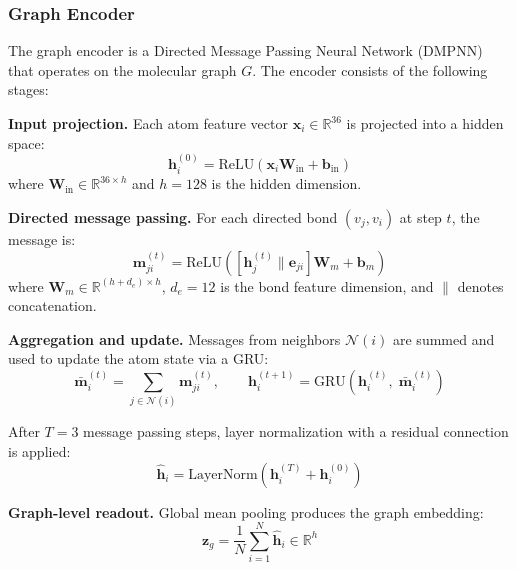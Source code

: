 \documentclass[a4paper,fleqn]{cas-sc}
\begin{document}
\subsubsection{Graph Encoder}

The graph encoder is a Directed Message Passing Neural Network (DMPNN) \citep{yang2019analyzing} that operates on the molecular graph $G$. The encoder consists of the following stages:

\textbf{Input projection.} Each atom feature vector $\mathbf{x}_i \in \mathbb{R}^{36}$ is projected into a hidden space:
\begin{equation}\label{eq:input_proj}
\mathbf{h}_i^{(0)} = \text{ReLU}(\mathbf{x}_i \mathbf{W}_{\text{in}} + \mathbf{b}_{\text{in}})
\end{equation}
where $\mathbf{W}_{\text{in}} \in \mathbb{R}^{36 \times h}$ and $h = 128$ is the hidden dimension.

\textbf{Directed message passing.} For each directed bond $(v_j, v_i)$ at step $t$, the message is:
\begin{equation}\label{eq:message}
\mathbf{m}_{ji}^{(t)} = \text{ReLU}\left( [\mathbf{h}_j^{(t)} \| \mathbf{e}_{ji}] \mathbf{W}_m + \mathbf{b}_m \right)
\end{equation}
where $\mathbf{W}_m \in \mathbb{R}^{(h + d_e) \times h}$, $d_e = 12$ is the bond feature dimension, and $\|$ denotes concatenation.

\textbf{Aggregation and update.} Messages from neighbors $\mathcal{N}(i)$ are summed and used to update the atom state via a GRU:
\begin{equation}\label{eq:update}
\bar{\mathbf{m}}_i^{(t)} = \sum_{j \in \mathcal{N}(i)} \mathbf{m}_{ji}^{(t)}, \qquad
\mathbf{h}_i^{(t+1)} = \text{GRU}\left(\mathbf{h}_i^{(t)},\; \bar{\mathbf{m}}_i^{(t)}\right)
\end{equation}

After $T = 3$ message passing steps, layer normalization with a residual connection is applied:
\begin{equation}\label{eq:layernorm}
\hat{\mathbf{h}}_i = \text{LayerNorm}\left(\mathbf{h}_i^{(T)} + \mathbf{h}_i^{(0)}\right)
\end{equation}

\textbf{Graph-level readout.} Global mean pooling produces the graph embedding:
\begin{equation}\label{eq:graph_pool}
\mathbf{z}_g = \frac{1}{N} \sum_{i=1}^{N} \hat{\mathbf{h}}_i \in \mathbb{R}^{h}
\end{equation}
\end{document}
